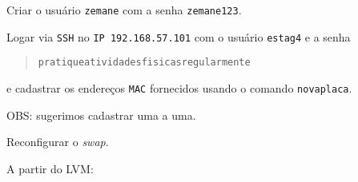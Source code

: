 \begin{questions}
\question
Criar o usuário \verb+zemane+ com a senha \verb+zemane123+.

\question
Logar via \verb+SSH+ no \verb+IP 192.168.57.101+ com o usuário \verb+estag4+
e a senha
\begin{quotation}
    \verb+pratiqueatividadesfisicasregularmente+
\end{quotation}
e cadastrar os endereços \verb+MAC+ fornecidos usando o
comando \verb+novaplaca+.

OBS: sugerimos cadastrar uma a uma.

\question
Reconfigurar o \textit{swap}.

\question
A partir do LVM:

\end{questions}

